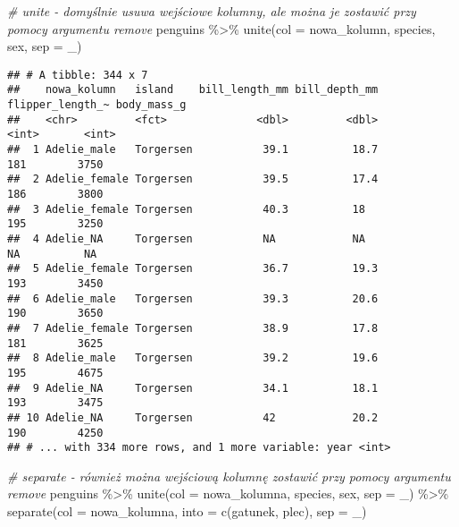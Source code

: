 \documentclass[
]{book}
\newenvironment{Shaded}{\begin{snugshade}}{\end{snugshade}}
\newcommand{\AttributeTok}[1]{\textcolor[rgb]{0.77,0.63,0.00}{#1}}
\newcommand{\CommentTok}[1]{\textcolor[rgb]{0.56,0.35,0.01}{\textit{#1}}}
\newcommand{\FunctionTok}[1]{\textcolor[rgb]{0.00,0.00,0.00}{#1}}
\newcommand{\NormalTok}[1]{#1}
\newcommand{\SpecialCharTok}[1]{\textcolor[rgb]{0.00,0.00,0.00}{#1}}
\newcommand{\StringTok}[1]{\textcolor[rgb]{0.31,0.60,0.02}{#1}}
\begin{document}
\begin{Shaded}
\begin{Highlighting}[]
\CommentTok{\# unite {-} domyślnie usuwa wejściowe kolumny, ale można je zostawić przy pomocy argumentu remove}
\NormalTok{penguins }\SpecialCharTok{\%\textgreater{}\%} \FunctionTok{unite}\NormalTok{(}\AttributeTok{col =}\NormalTok{ nowa\_kolumn, species, sex, }\AttributeTok{sep =} \StringTok{\textquotesingle{}\_\textquotesingle{}}\NormalTok{)}
\end{Highlighting}
\end{Shaded}

\begin{verbatim}
## # A tibble: 344 x 7
##    nowa_kolumn   island    bill_length_mm bill_depth_mm flipper_length_~ body_mass_g
##    <chr>         <fct>              <dbl>         <dbl>            <int>       <int>
##  1 Adelie_male   Torgersen           39.1          18.7              181        3750
##  2 Adelie_female Torgersen           39.5          17.4              186        3800
##  3 Adelie_female Torgersen           40.3          18                195        3250
##  4 Adelie_NA     Torgersen           NA            NA                 NA          NA
##  5 Adelie_female Torgersen           36.7          19.3              193        3450
##  6 Adelie_male   Torgersen           39.3          20.6              190        3650
##  7 Adelie_female Torgersen           38.9          17.8              181        3625
##  8 Adelie_male   Torgersen           39.2          19.6              195        4675
##  9 Adelie_NA     Torgersen           34.1          18.1              193        3475
## 10 Adelie_NA     Torgersen           42            20.2              190        4250
## # ... with 334 more rows, and 1 more variable: year <int>
\end{verbatim}

\begin{Shaded}
\begin{Highlighting}[]
\CommentTok{\# separate {-} również można wejściową kolumnę zostawić przy pomocy argumentu remove}
\NormalTok{penguins }\SpecialCharTok{\%\textgreater{}\%} \FunctionTok{unite}\NormalTok{(}\AttributeTok{col =}\NormalTok{ nowa\_kolumna, species, sex, }\AttributeTok{sep =} \StringTok{\textquotesingle{}\_\textquotesingle{}}\NormalTok{) }\SpecialCharTok{\%\textgreater{}\%}
  \FunctionTok{separate}\NormalTok{(}\AttributeTok{col =}\NormalTok{ nowa\_kolumna, }\AttributeTok{into =} \FunctionTok{c}\NormalTok{(}\StringTok{\textquotesingle{}gatunek\textquotesingle{}}\NormalTok{, }\StringTok{\textquotesingle{}plec\textquotesingle{}}\NormalTok{), }\AttributeTok{sep =} \StringTok{\textquotesingle{}\_\textquotesingle{}}\NormalTok{)}
\end{Highlighting}
\end{Shaded}
\end{document}

